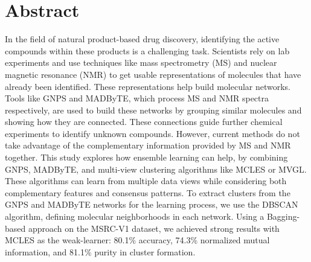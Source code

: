 \chapter*{Abstract}




In the field of natural product-based drug discovery, identifying the active compounds within these products is a challenging task. Scientists rely on lab experiments and use techniques like mass spectrometry (MS) and nuclear magnetic resonance (NMR) to get usable representations of molecules that have already been identified. These representations help build molecular networks.
Tools like GNPS and MADByTE, which process MS and NMR spectra respectively, are used to build these networks by grouping similar molecules and showing how they are connected. These connections guide further chemical experiments to identify unknown compounds.
However, current methods do not take advantage of the complementary information provided by MS and NMR together. This study explores how ensemble learning can help, by combining GNPS, MADByTE, and multi-view clustering algorithms like MCLES or MVGL. These algorithms can learn from multiple data views while considering both complementary features and consensus patterns.
To extract clusters from the GNPS and MADByTE networks for the learning process, we use the DBSCAN algorithm, defining molecular neighborhoods in each network. Using a Bagging-based approach on the MSRC-V1 dataset, we achieved strong results with MCLES as the weak-learner: 80.1\% accuracy, 74.3\% normalized mutual information, and 81.1\% purity in cluster formation.

